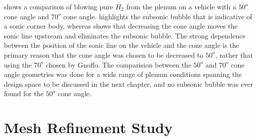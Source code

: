  shows a comparison of blowing pure $H_2$ from the
plenum on a vehicle with a $50^o$ cone angle and $70^o$ cone angle.
 highlights the subsonic bubble that is indicative of a
sonic corner body, whereas  shows that decreasing the cone
angle moves the sonic line upstream and eliminates the subsonic bubble.  The
strong dependence between the position of the sonic line on the vehicle and the
cone angle is the primary reason that the cone angle was chosen to be decreased
to $50^o$, rather that using the $70^o$ chosen by
Gnoffo\cite{gnoffo2016tapping}.  The comparision between the $50^o$ and
$70^o$ cone angle geometries was done for a wide range of plenum conditions
spanning the design space to be discussed in the next chapter, and no subsonic
bubble was ever found for the $50^o$ cone angle.

\section{Mesh Refinement Study}
\label{sec:mesh-refinement-study}

